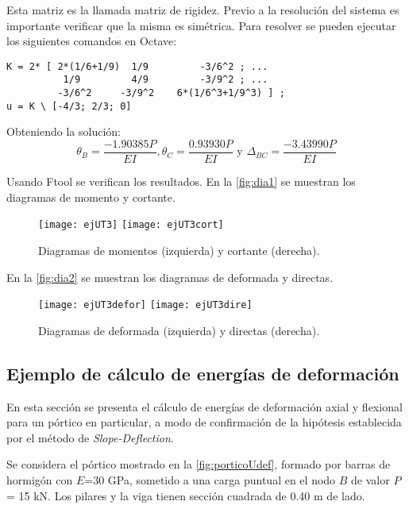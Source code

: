 Esta matriz es la llamada matriz de rigidez. Previo a la resolución del sistema es importante verificar que la misma es simétrica. %
%
Para resolver se pueden ejecutar los siguientes comandos en Octave:

\begin{verbatim}
K = 2* [ 2*(1/6+1/9)  1/9         -3/6^2 ; ...
          1/9         4/9         -3/9^2 ; ...
         -3/6^2     -3/9^2    6*(1/6^3+1/9^3) ] ;
u = K \ [-4/3; 2/3; 0]
\end{verbatim}


Obteniendo la solución:
\begin{equation}
\theta_B = \frac{ -1.90385 P }{EI}, \theta_C = \frac{ 0.93930
 P }{EI} \text{ y } \Delta_{BC} = \frac{-3.43990 P }{EI}
\end{equation}

Usando Ftool se verifican los resultados. En la \autoref{fig:dia1} se muestran los diagramas de momento y cortante.
\begin{figure}[htb]
	\centering
	\texttt{[image: ejUT3]}
	\texttt{[image: ejUT3cort]}
	\caption{Diagramas de momentos (izquierda) y cortante (derecha).}
	\label{fig:dia1}
\end{figure}

En la \autoref{fig:dia2} se muestran los diagramas de deformada y directas.
\begin{figure}[htb]
	\centering
	\texttt{[image: ejUT3defor]}
	\texttt{[image: ejUT3dire]}
	\caption{Diagramas de deformada (izquierda) y directas (derecha).}
	\label{fig:dia2}
\end{figure}


\clearpage

\subsection{Ejemplo de cálculo de energías de deformación} \label{sec:ejenergdef}

En esta sección se presenta el cálculo de energías de deformación axial y flexional para un pórtico en particular, a modo de confirmación de la hipótesis establecida por el método de \textit{Slope-Deflection}.

Se considera el pórtico mostrado en la \autoref{fig:porticoUdef}, formado por barras de hormigón con $E$=30 GPa, sometido a una carga puntual en el nodo $B$ de valor $P$= 15 kN. Los pilares y la viga tienen sección cuadrada de 0.40 m de lado.

